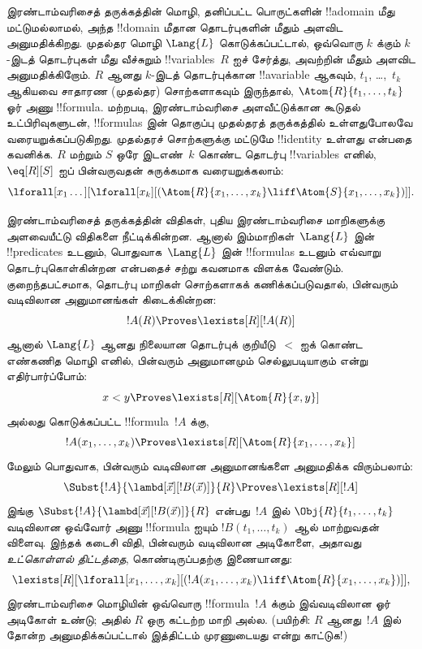 \documentclass[../../../include/open-logic-section]{subfiles}
\begin{document}



இரண்டாம்வரிசைத் தருக்கத்தின் மொழி, தனிப்பட்ட பொருட்களின்
!!a{domain} மீது மட்டுமல்லாமல், அந்த !!{domain} மீதான தொடர்புகளின்
மீதும் அளவிட அனுமதிக்கிறது. முதல்தர மொழி $\Lang{L}$ கொடுக்கப்பட்டால்,
ஒவ்வொரு $k$ க்கும் $k$-இடத் தொடர்புகள் மீது வீச்சுறும்
!!{variable}s~$R$ ஐச் சேர்த்து, அவற்றின் மீதும் அளவிட அனுமதிக்கிறோம்.
$R$ ஆனது $k$-இடத் தொடர்புக்கான !!a{variable} ஆகவும், $t_1$,
\dots,~$t_k$ ஆகியவை சாதாரண (முதல்தர) சொற்களாகவும் இருந்தால்,
$\Atom{R}{t_1,\dots,t_k}$ ஓர் அணு !!{formula}. மற்றபடி,
இரண்டாம்வரிசை அளவீட்டுக்கான கூடுதல் உட்பிரிவுகளுடன், !!{formula}s இன்
தொகுப்பு முதல்தரத் தருக்கத்தில் உள்ளதுபோலவே வரையறுக்கப்படுகிறது.
முதல்தரச் சொற்களுக்கு மட்டுமே !!{identity} உள்ளது என்பதை கவனிக்க.
$R$ மற்றும் $S$ ஒரே இடஎண்~$k$ கொண்ட தொடர்பு !!{variable}s எனில்,
$\eq[R][S]$ ஐப் பின்வருவதன் சுருக்கமாக வரையறுக்கலாம்:
\[
\lforall[x_1 \dots][\lforall[x_k][(\Atom{R}{x_1, \dots, x_k} \liff
  \Atom{S}{x_1, \dots, x_k})]].
\]

இரண்டாம்வரிசைத் தருக்கத்தின் விதிகள், புதிய இரண்டாம்வரிசை மாறிகளுக்கு
அளவையீட்டு விதிகளை நீட்டிக்கின்றன. ஆனால் இம்மாறிகள்~$\Lang{L}$ இன்
!!{predicate}s உடனும், பொதுவாக~$\Lang{L}$ இன் !!{formula}s உடனும்
எவ்வாறு தொடர்புகொள்கின்றன என்பதைச் சற்று கவனமாக விளக்க வேண்டும்.
குறைந்தபட்சமாக, தொடர்பு மாறிகள் சொற்களாகக் கணிக்கப்படுவதால்,
பின்வரும் வடிவிலான அனுமானங்கள் கிடைக்கின்றன:
\[
!A(R) \Proves \lexists[R][!A(R)]
\]
ஆனால் $\Lang{L}$ ஆனது நிலையான தொடர்புக் குறியீடு~$<$ ஐக் கொண்ட
எண்கணித மொழி எனில், பின்வரும் அனுமானமும் செல்லுபடியாகும் என்று
எதிர்பார்ப்போம்:
\[
x < y \Proves \lexists[R][\Atom{R}{x,y}]
\]
அல்லது கொடுக்கப்பட்ட !!{formula}~$!A$ க்கு,
\[
!A(x_1, \dots, x_k) \Proves \lexists[R][\Atom{R}{x_1,\dots,x_k}]
\]
மேலும் பொதுவாக, பின்வரும் வடிவிலான அனுமானங்களை அனுமதிக்க விரும்பலாம்:
\[
\Subst{!A}{\lambd[\vec x][!B(\vec x)]}{R} \Proves
\lexists[R][!A]
\]
இங்கு $\Subst{!A}{\lambd[\vec x][!B(\vec x)]}{R}$ என்பது~$!A$ இல்
$\Obj{R}{t_1,\dots,t_k}$ வடிவிலான ஒவ்வோர் அணு !!{formula} ஐயும்
$!B(t_1, \dots, t_k)$ ஆல் மாற்றுவதன் விளைவு. இந்தக் கடைசி விதி,
பின்வரும் வடிவிலான அடிகோளை, அதாவது {\em உட்கொள்ளல் திட்டத்தை}, கொண்டிருப்பதற்கு
இணையானது:
\[
\lexists[R][\lforall[x_1, \dots, x_k][(!A(x_1, \dots, x_k) \liff
\Atom{R}{x_1, \dots, x_k})]],
\]
இரண்டாம்வரிசை மொழியின் ஒவ்வொரு !!{formula}~$!A$ க்கும் இவ்வடிவிலான
ஓர் அடிகோள் உண்டு; அதில் $R$ ஒரு கட்டற்ற மாறி அல்ல. (பயிற்சி:
$R$ ஆனது~$!A$ இல் தோன்ற அனுமதிக்கப்பட்டால் இத்திட்டம் முரணுடையது
என்று காட்டுக!)
\end{document}
